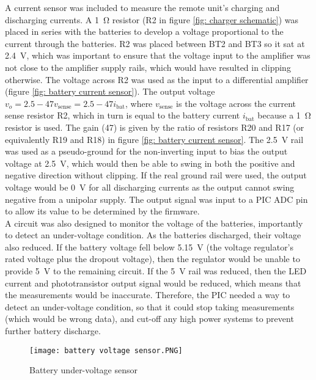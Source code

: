 A current sensor was included to measure the remote unit's charging and discharging currents. A \SI{1}{\ohm} resistor (R2 in figure \ref{fig: charger schematic}) was placed in series with the batteries to develop a voltage proportional to the current through the batteries. R2 was placed between BT2 and BT3 so it sat at \SI{2.4}{\volt}, which was important to ensure that the voltage input to the amplifier was not close to the amplifier supply rails, which would have resulted in clipping otherwise. The voltage across R2 was used as the input to a differential amplifier (figure \ref{fig: battery current sensor}). The output voltage $v_o = 2.5 - 47v_\text{sense} = 2.5 - 47 i_\text{bat}$, where $v_\text{sense}$ is the voltage across the current sense resistor R2, which in turn is equal to the battery current $i_\text{bat}$ because a \SI{1}{\ohm} resistor is used. The gain (47) is given by the ratio of resistors R20 and R17 (or equivalently R19 and R18) in figure \ref{fig: battery current sensor}. The \SI{2.5}{\volt} rail was used as a pseudo-ground for the non-inverting input to bias the output voltage at \SI{2.5}{\volt}, which would then be able to swing in both the positive and negative direction without clipping. If the real ground rail were used, the output voltage would be \SI{0}{\volt} for all discharging currents as the output cannot swing negative from a unipolar supply. The output signal was input to a PIC ADC pin to allow its value to be determined by the firmware.\\



A circuit was also designed to monitor the voltage of the batteries, importantly to detect an under-voltage condition. As the batteries discharged, their voltage also reduced. If the battery voltage fell below \SI{5.15}{\volt} (the voltage regulator's rated voltage plus the dropout voltage), then the regulator would be unable to provide \SI{5}{\volt} to the remaining circuit. If the \SI{5}{\volt} rail was reduced, then the LED current and phototransistor output signal would be reduced, which means that the measurements would be inaccurate. Therefore, the PIC needed a way to detect an under-voltage condition, so that it could stop taking measurements (which would be wrong data), and cut-off any high power systems to prevent further battery discharge.\\

\begin{figure}[htbp]
	\centering
	\texttt{[image: battery voltage sensor.PNG]}
	\caption{Battery under-voltage sensor}
	\label{fig: battery voltage sensor}
\end{figure}

